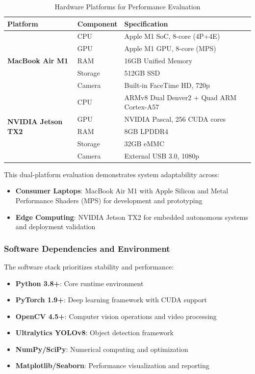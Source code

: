 \documentclass[10pt]{article}
\begin{document}
\begin{table}[ht]
\centering
\caption{Hardware Platforms for Performance Evaluation}
\label{tab:hardware_config}
\begin{tabular}{@{}lll@{}}
\toprule
\textbf{Platform} & \textbf{Component} & \textbf{Specification} \\
\midrule
\multirow{5}{*}{\textbf{MacBook Air M1}} & CPU & Apple M1 SoC, 8-core (4P+4E) \\
 & GPU & Apple M1 GPU, 8-core (MPS) \\
 & RAM & 16GB Unified Memory \\
 & Storage & 512GB SSD \\
 & Camera & Built-in FaceTime HD, 720p \\
\midrule
\multirow{5}{*}{\textbf{NVIDIA Jetson TX2}} & CPU & ARMv8 Dual Denver2 + Quad ARM Cortex-A57 \\
 & GPU & NVIDIA Pascal, 256 CUDA cores \\
 & RAM & 8GB LPDDR4 \\
 & Storage & 32GB eMMC \\
 & Camera & External USB 3.0, 1080p \\
\bottomrule
\end{tabular}
\end{table}

This dual-platform evaluation demonstrates system adaptability across:
\begin{itemize}
\item \textbf{Consumer Laptops}: MacBook Air M1 with Apple Silicon and Metal Performance Shaders (MPS) for development and prototyping
\item \textbf{Edge Computing}: NVIDIA Jetson TX2 for embedded autonomous systems and deployment validation
\end{itemize}

\subsubsection{Software Dependencies and Environment}

The software stack prioritizes stability and performance:

\begin{itemize}
\item \textbf{Python 3.8+}: Core runtime environment
\item \textbf{PyTorch 1.9+}: Deep learning framework with CUDA support
\item \textbf{OpenCV 4.5+}: Computer vision operations and video processing
\item \textbf{Ultralytics YOLOv8}: Object detection framework
\item \textbf{NumPy/SciPy}: Numerical computing and optimization
\item \textbf{Matplotlib/Seaborn}: Performance visualization and reporting
\end{itemize}
\end{document}
